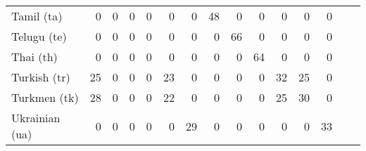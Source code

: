 \documentclass{csbulletin}
\begin{document}
\begin{table}[b]
\begin{tabular}{lrrrrrrrrrrrrrr}
Tamil (ta) %
  & 0%
  & 0%
  & 0%
  & 0%
  & 0%
  & 0%
  & 48%
  & 0 %
  & 0%
  & 0%
  & 0%
  & 0%
  \\
Telugu (te) %
  & 0%
  & 0%
  & 0%
  & 0%
  & 0%
  & 0%
  & 0%
  & 66%
  & 0%
  & 0%
  & 0%
  & 0%
  \\
Thai (th) %
  & 0%
  & 0%
  & 0%
  & 0%
  & 0%
  & 0%
  & 0%
  & 0%
  & 64%
  & 0%
  & 0%
  & 0%
  \\
Turkish (tr) %
  & 25%
  & 0%
  & 0%
  & 0%
  & 23%
  & 0%
  & 0%
  & 0%
  & 0%
  & 32%
  & 25%
  & 0%
  \\
Turkmen (tk) %
  & 28%
  & 0%
  & 0%
  & 0%
  & 22%
  & 0%
  & 0%
  & 0%
  & 0%
  & 25%
  & 30%
  & 0%
  \\
Ukrainian (ua) %
  & 0%
  & 0%
  & 0%
  & 0%
  & 0%
  & 29%
  & 0%
  & 0%
  & 0%
  & 0%
  & 0%
  & 33%
  \\
\bottomrule
\end{tabular}
\end{table}

\end{document}
